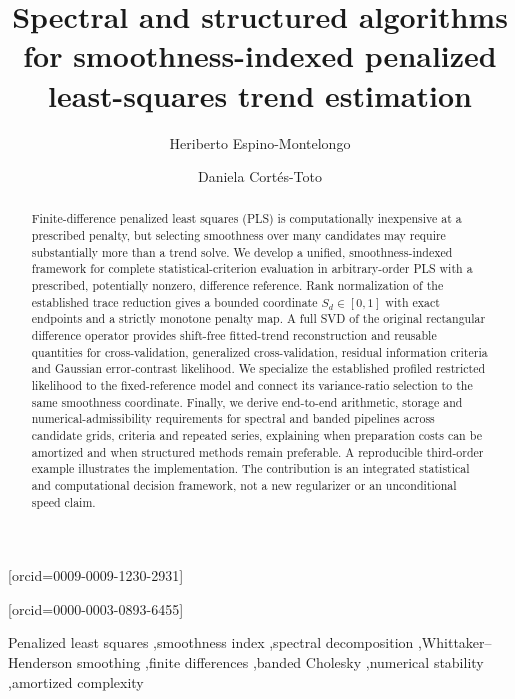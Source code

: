 \documentclass[a4paper,fleqn]{cas-dc}
\newcommand{\1}{\mathbf 1}
\begin{document}
\let\WriteBookmarks\relax
\def\floatpagepagefraction{1}
\def\textpagefraction{.001}
\title[mode=title]{Spectral and structured algorithms for smoothness-indexed penalized least-squares trend estimation}
\author[1]{Heriberto Espino-Montelongo}[orcid=0009-0009-1230-2931]
\cormark[1]
\author[2]{Daniela Cort\'es-Toto}[orcid=0000-0003-0893-6455]
\begin{abstract}
Finite-difference penalized least squares (PLS) is
computationally inexpensive at a prescribed penalty,
but selecting smoothness over many candidates may
require substantially more than a trend solve.
We develop a unified, smoothness-indexed framework
for complete statistical-criterion evaluation in
arbitrary-order PLS with a prescribed, potentially
nonzero, difference reference.  Rank normalization
of the established trace reduction gives a bounded
coordinate $S_d\in[0,1]$ with exact endpoints
and a strictly monotone penalty map.  A full
SVD of the original rectangular difference operator
provides shift-free fitted-trend reconstruction
and reusable quantities for cross-validation,
generalized cross-validation, residual information
criteria and Gaussian error-contrast likelihood.
We specialize the established profiled restricted
likelihood to the fixed-reference model and connect
its variance-ratio selection to the same smoothness
coordinate.  Finally, we derive end-to-end arithmetic,
storage and numerical-admissibility requirements for
spectral and banded pipelines across candidate grids,
criteria and repeated series, explaining when
preparation costs can be amortized and when structured
methods remain preferable.  A reproducible third-order
example illustrates the implementation.  The
contribution is an integrated statistical and
computational decision framework, not a new
regularizer or an unconditional speed claim.
\end{abstract}
\begin{keywords}
Penalized least squares \sep smoothness index \sep spectral decomposition
\sep Whittaker--Henderson smoothing \sep finite differences
\sep banded Cholesky \sep numerical stability \sep amortized complexity
\end{keywords}
\maketitle
\end{document}
